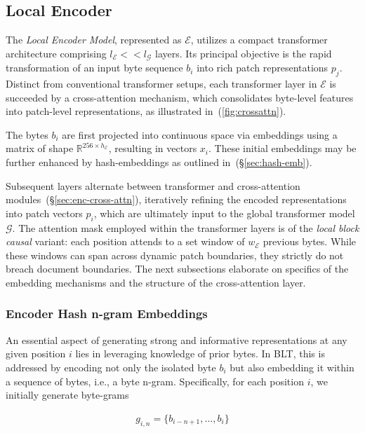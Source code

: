 \subsection{Local Encoder}
\label{section:local}

The \textit{Local Encoder Model}, represented as $\mathcal{E}$, utilizes a compact transformer architecture comprising $l_{\mathcal{E}} << l_{\mathcal{G}}$ layers. Its principal objective is the rapid transformation of an input byte sequence $b_i$ into rich patch representations $p_j$. Distinct from conventional transformer setups, each transformer layer in $\mathcal{E}$ is succeeded by a cross-attention mechanism, which consolidates byte-level features into patch-level representations, as illustrated in~(\autoref{fig:crossattn}).

The bytes $b_i$ are first projected into continuous space via embeddings using a matrix of shape $\mathbb{R}^{256 \times h_{\mathcal{E}}}$, resulting in vectors $x_i$. These initial embeddings may be further enhanced by hash-embeddings as outlined in~(\S\ref{sec:hash-emb}).

Subsequent layers alternate between transformer and cross-attention modules~(\S\ref{sec:enc-cross-attn}), iteratively refining the encoded representations into patch vectors $p_i$, which are ultimately input to the global transformer model $\mathcal{G}$. The attention mask employed within the transformer layers is of the \textit{local block causal} variant: each position attends to a set window of $w_{\mathcal{E}}$ previous bytes. While these windows can span across dynamic patch boundaries, they strictly do not breach document boundaries. The next subsections elaborate on specifics of the embedding mechanisms and the structure of the cross-attention layer.

\subsubsection{Encoder Hash n-gram Embeddings}
\label{sec:ngram-emb}
\label{sec:hash-emb}
An essential aspect of generating strong and informative representations at any given position $i$ lies in leveraging knowledge of prior bytes. In {\textsc BLT}, this is addressed by encoding not only the isolated byte $b_i$ but also embedding it within a sequence of bytes, i.e., a byte n-gram. Specifically, for each position $i$, we initially generate byte-grams

\begin{align}
    g_{i,n}=\{b_{i-n + 1},\ldots, b_i\}
\end{align}

